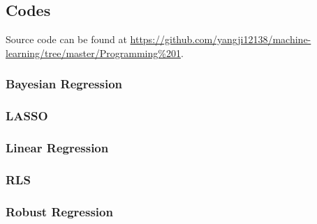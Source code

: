 \documentclass{article}
\begin{document}
\subsection*{Codes}

Source code can be found at \url{https://github.com/yangji12138/machine-learning/tree/master/Programming%201}.

\subsubsection*{Bayesian Regression}



\subsubsection*{LASSO}



\subsubsection*{Linear Regression}



\subsubsection*{RLS}



\subsubsection*{Robust Regression}


\end{document}
